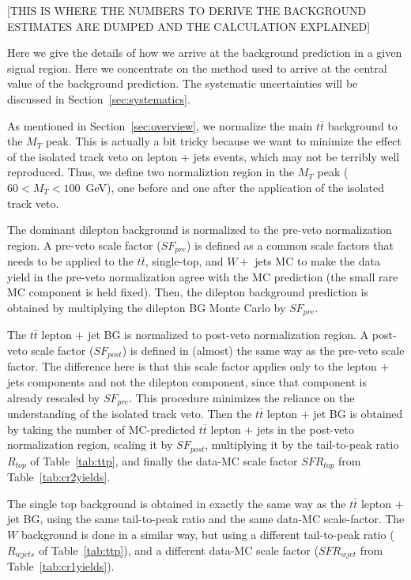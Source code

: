 

[THIS IS WHERE THE NUMBERS TO DERIVE THE BACKGROUND ESTIMATES ARE DUMPED AND THE CALCULATION EXPLAINED]

Here we give the details of how we arrive at the background prediction
in a given signal region.  Here we concentrate on the method used
to arrive at the central value of the background prediction.  The
systematic
uncertainties will be discussed in Section~\ref{sec:systematics}.

As mentioned in Section~\ref{sec:overview}, we normalize the main
$t\bar{t}$
background to the $M_T$ peak.  This is actually a bit tricky because 
we want to minimize the effect of the isolated track veto on 
lepton $+$ jets events, which may not be terribly well reproduced.
Thus, we define two normaliztion region in the $M_T$ peak ($60 < M_T < 100$~GeV),
one before and one after the application of the isolated track veto.

The dominant dilepton background is normalized to the pre-veto normalization
region.  A pre-veto scale factor ($SF_{pre}$) is defined as a common scale
factors that needs to be applied to the $t\bar{t}$, single-top, and 
$W +$ jets
MC to make the data yield in the pre-veto normalization agree with
the MC prediction (the small rare MC component is held fixed).
Then, the dilepton background prediction is obtained by multiplying the
dilepton BG Monte Carlo by $SF_{pre}$.

The $t\bar{t}$ lepton $+$ jet BG is normalized to post-veto 
normalization region.  A post-veto scale factor  ($SF_{post}$) 
is defined in (almost) the same way as the pre-veto scale factor.
The difference here is that this scale factor applies only to 
the lepton $+$ jets components and not the dilepton component,
since that component is already rescaled by $SF_{pre}$.  
This procedure minimizes the reliance on the understanding of 
the isolated track veto.
Then the  $t\bar{t}$ lepton $+$ jet BG is obtained by taking the 
number of MC-predicted $t\bar{t}$ lepton $+$ jets in the post-veto
normalization region, scaling it by $SF_{post}$, multiplying 
it by the tail-to-peak ratio $R_{top}$ of Table~\ref{tab:ttp}, and
finally the data-MC scale factor $SFR_{top}$ from
Table~\ref{tab:cr2yields}.

The single top background is obtained in exactly the same way
as the  $t\bar{t}$ lepton $+$ jet BG, using the same tail-to-peak
ratio and the same data-MC scale-factor.  The $W$ background is
done in a similar way, but using a different tail-to-peak ratio 
($R_{wjets}$ of Table~\ref{tab:ttp}), and a different data-MC scale
factor
($SFR_{wjet}$ from
Table~\ref{tab:cr1yields}).

